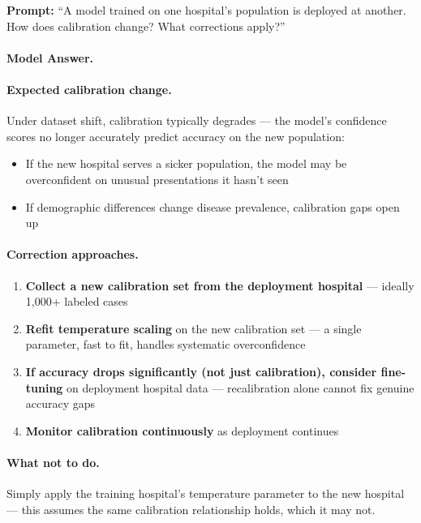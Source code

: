 \textbf{Prompt:} ``A model trained on one hospital's population is deployed at another. How does calibration change? What corrections apply?''

\paragraph{Model Answer.}

\paragraph{Expected calibration change.} Under dataset shift, calibration typically degrades --- the model's confidence scores no longer accurately predict accuracy on the new population:
\begin{itemize}
    \item If the new hospital serves a sicker population, the model may be overconfident on unusual presentations it hasn't seen
    \item If demographic differences change disease prevalence, calibration gaps open up
\end{itemize}

\paragraph{Correction approaches.}
\begin{enumerate}
    \item \textbf{Collect a new calibration set from the deployment hospital} --- ideally 1,000+ labeled cases
    \item \textbf{Refit temperature scaling} on the new calibration set --- a single parameter, fast to fit, handles systematic overconfidence
    \item \textbf{If accuracy drops significantly (not just calibration), consider fine-tuning} on deployment hospital data --- recalibration alone cannot fix genuine accuracy gaps
    \item \textbf{Monitor calibration continuously} as deployment continues
\end{enumerate}

\paragraph{What not to do.} Simply apply the training hospital's temperature parameter to the new hospital --- this assumes the same calibration relationship holds, which it may not.

